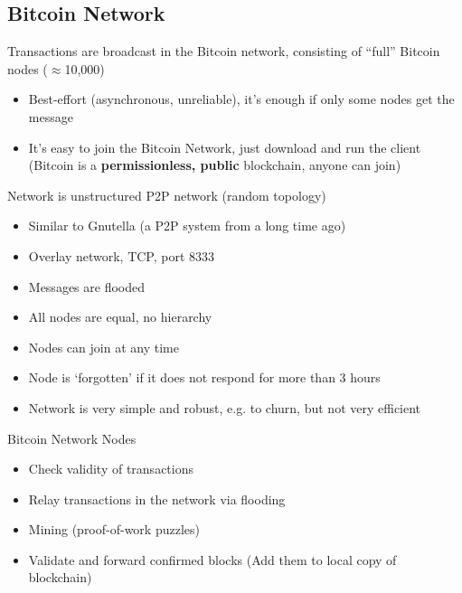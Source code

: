 \subsection{Bitcoin Network}
Transactions are broadcast in the Bitcoin network, consisting of ``full'' Bitcoin nodes ($\approx$10,000)
\begin{itemize}
	\item Best-effort (asynchronous, unreliable), it's enough if only some nodes get the message
	\item It's easy to join the Bitcoin Network, just download and run the client (Bitcoin is a \textbf{permissionless, public} blockchain, anyone can join)
\end{itemize}
Network is unstructured P2P network (random topology)
\begin{itemize}
	\item Similar to Gnutella (a P2P system from a long time ago)
	\item Overlay network, TCP, port 8333
	\item Messages are flooded
	\item All nodes are equal, no hierarchy
	\item Nodes can join at any time
	\item Node is `forgotten' if it does not respond for more than 3 hours
	\item Network is very simple and robust, e.g. to churn, but not very efficient
\end{itemize}
\begin{note}{Bitcoin Network Nodes}
	\begin{itemize}
		\item Check validity of transactions
		\item Relay transactions in the network via flooding
		\item Mining (proof-of-work puzzles)
		\item Validate and forward confirmed blocks (Add them to local copy of blockchain)
	\end{itemize}
\end{note}
